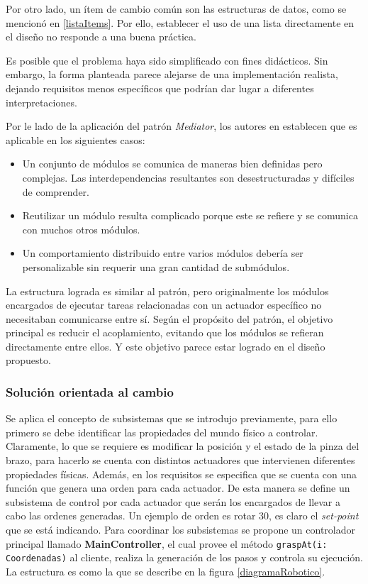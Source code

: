 Por otro lado, un ítem de cambio común son las estructuras de datos, como se mencionó en \ref{listaItems}. Por ello, establecer el uso de una lista directamente en el diseño no responde a una buena práctica.

Es posible que el problema haya sido simplificado con fines didácticos. Sin embargo, la forma planteada parece alejarse de una implementación realista, dejando requisitos menos específicos que podrían dar lugar a diferentes interpretaciones.

Por le lado de la aplicación del patrón \textit{Mediator}, los autores en \cite{Gamma:1995:DPE:186897} establecen que es aplicable en los siguientes casos:
\begin{itemize}
\item Un conjunto de módulos se comunica de maneras bien definidas pero complejas. Las interdependencias resultantes son desestructuradas y difíciles de comprender.

\item Reutilizar un módulo resulta complicado porque este se refiere y se comunica con muchos otros módulos.

\item Un comportamiento distribuido entre varios módulos debería ser personalizable sin requerir una gran cantidad de submódulos.
\end{itemize}

La estructura lograda es similar al patrón, pero originalmente los módulos encargados de ejecutar tareas relacionadas con un actuador específico no necesitaban comunicarse entre sí. Según el propósito del patrón, el objetivo principal es reducir el acoplamiento, evitando que los módulos se refieran directamente entre ellos. Y este objetivo parece estar logrado en el diseño propuesto.

\subsubsection*{Solución orientada al cambio}

Se aplica el concepto de subsistemas que se introdujo previamente, para ello primero se debe identificar las propiedades del mundo físico a controlar. Claramente, lo que se requiere es modificar la posición y el estado de la pinza del brazo, para hacerlo se cuenta con distintos actuadores que intervienen diferentes propiedades físicas. Además, en los requisitos se especifica que se cuenta con una función que genera una orden para cada actuador. De esta manera se define un subsistema de control por cada actuador que serán los encargados de llevar a cabo las ordenes generadas. Un ejemplo de orden es rotar 30\textdegree, es claro el \textit{set-point} que se está indicando. Para coordinar los subsistemas se propone un controlador principal llamado \textbf{MainController}, el cual provee el método \verb|graspAt(i: Coordenadas)| al cliente, realiza la generación de los pasos y controla su ejecución. La estructura es como la que se describe en la figura \ref{diagramaRobotico}.


